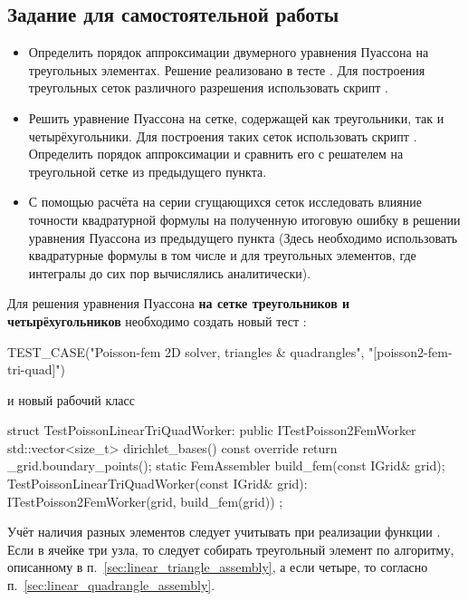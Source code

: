 \subsection{Задание для самостоятельной работы}
\begin{itemize}
\item
Определить порядок аппроксимации двумерного уравнения Пуассона на треугольных элементах.
Решение реализовано в тесте .
Для построения треугольных сеток различного разрешения использовать
скрипт .
\item
Решить уравнение Пуассона на сетке, содержащей как треугольники, так и четырёхугольники.
Для построения таких сеток использовать скрипт .
Определить порядок аппроксимации и сравнить его с решателем на треугольной сетке из предыдущего пункта.
\item
С помощью расчёта на серии сгущающихся сеток исследовать влияние точности квадратурной формулы на полученную итоговую ошибку в решении
уравнения Пуассона из предыдущего пункта (Здесь необходимо использовать квадратурные формулы
в том числе и для треугольных элементов, где интегралы до сих пор вычислялись аналитически).
\end{itemize}

Для решения уравнения Пуассона {\bf на сетке треугольников и четырёхугольников} необходимо создать новый тест :
\begin{cppcode}
TEST_CASE("Poisson-fem 2D solver, triangles & quadrangles", "[poisson2-fem-tri-quad]")
\end{cppcode}
и новый рабочий класс
\begin{cppcode}
struct TestPoissonLinearTriQuadWorker: public ITestPoisson2FemWorker{
	std::vector<size_t> dirichlet_bases() const override{
		return _grid.boundary_points();
	}
	static FemAssembler build_fem(const IGrid& grid);
	TestPoissonLinearTriQuadWorker(const IGrid& grid):
		ITestPoisson2FemWorker(grid, build_fem(grid)){ }
};
\end{cppcode}
Учёт наличия разных элементов следует учитывать при реализации функции .
Если в ячейке три узла, то следует собирать треугольный элемент по
алгоритму, описанному в п.~\ref{sec:linear_triangle_assembly},
а если четыре, то согласно п.~\ref{sec:linear_quadrangle_assembly}.


